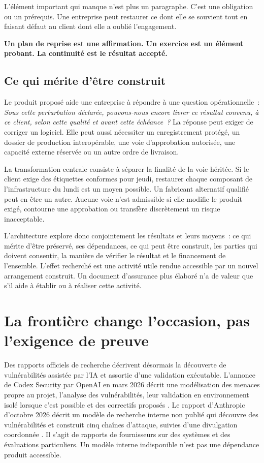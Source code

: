 \documentclass[11pt,a4paper]{article}
\begin{document}
L’élément important qui manque n’est plus un paragraphe. C’est une obligation ou un prérequis. Une entreprise peut restaurer ce dont elle se souvient tout en faisant défaut au client dont elle a oublié l’engagement.

\begin{insight}
\textbf{Un plan de reprise est une affirmation. Un exercice est un élément probant. La continuité est le résultat accepté.}
\end{insight}

\subsection{Ce qui mérite d’être construit}
Le produit proposé aide une entreprise à répondre à une question opérationnelle~: \emph{Sous cette perturbation déclarée, pouvons-nous encore livrer ce résultat convenu, à ce client, selon cette qualité et avant cette échéance~?} La réponse peut exiger de corriger un logiciel. Elle peut aussi nécessiter un enregistrement protégé, un dossier de production interopérable, une voie d’approbation autorisée, une capacité externe réservée ou un autre ordre de livraison.

La transformation centrale consiste à séparer la finalité de la voie héritée. Si le client exige des étiquettes conformes pour jeudi, restaurer chaque composant de l’infrastructure du lundi est un moyen possible. Un fabricant alternatif qualifié peut en être un autre. Aucune voie n’est admissible si elle modifie le produit exigé, contourne une approbation ou transfère discrètement un risque inacceptable.

L’architecture explore donc conjointement les résultats et leurs moyens~: ce qui mérite d’être préservé, ses dépendances, ce qui peut être construit, les parties qui doivent consentir, la manière de vérifier le résultat et le financement de l’ensemble. L’effet recherché est une activité utile rendue accessible par un nouvel arrangement construit. Un document d’assurance plus élaboré n’a de valeur que s’il aide à établir ou à réaliser cette activité.

\section{La frontière change l’occasion, pas l’exigence de preuve}\label{sec:frontier}
Des rapports officiels de recherche décrivent désormais la découverte de vulnérabilités assistée par l’IA et assortie d’une validation exécutable. L’annonce de Codex Security par OpenAI en mars 2026 décrit une modélisation des menaces propre au projet, l’analyse des vulnérabilités, leur validation en environnement isolé lorsque c’est possible et des correctifs proposés \cite{codexSecurity}. Le rapport d’Anthropic d’octobre 2026 décrit un modèle de recherche interne non publié qui découvre des vulnérabilités et construit cinq chaînes d’attaque, suivies d’une divulgation coordonnée \cite{anthropicCyber}. Il s’agit de rapports de fournisseurs sur des systèmes et des évaluations particuliers. Un modèle interne indisponible n’est pas une dépendance produit accessible.
\end{document}
